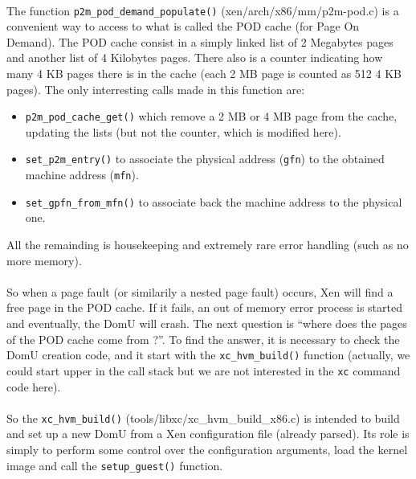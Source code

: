 \paragraph{}
The function \verb!p2m_pod_demand_populate()! (xen/arch/x86/mm/p2m-pod.c) is
a convenient way to access to what is called the POD cache (for Page On
Demand).
The POD cache consist in a simply linked list of 2 Megabytes pages and another
list of 4 Kilobytes pages.
There also is a counter indicating how many 4 KB pages there is in the cache
(each 2 MB page is counted as 512 4 KB pages).
The only interresting calls made in this function are:
\begin{itemize}
\item \verb!p2m_pod_cache_get()! which remove a 2 MB or 4 MB page from the
  cache, updating the lists (but not the counter, which is modified here).
\item \verb!set_p2m_entry()! to associate the physical address (\verb!gfn!)
  to the obtained machine address (\verb!mfn!).
\item \verb!set_gpfn_from_mfn()! to associate back the machine address to
  the physical one.
\end{itemize}
All the remainding is housekeeping and extremely rare error handling (such as
no more memory).

\paragraph{}
So when a page fault (or similarily a nested page fault) occurs, Xen will find
a free page in the POD cache.
If it fails, an out of memory error process is started and eventually, the
DomU will crash.
The next question is ``where does the pages of the POD cache come from ?''.
To find the answer, it is necessary to check the DomU creation code, and it
start with the \verb!xc_hvm_build()! function (actually, we could start upper
in the call stack but we are not interested in the \verb!xc! command code
here).

\paragraph{}
So the \verb!xc_hvm_build()! (tools/libxc/xc\_hvm\_build\_x86.c) is intended to
build and set up a new DomU from a Xen configuration file (already parsed).
Its role is simply to perform some control over the configuration arguments,
load the kernel image and call the \verb!setup_guest()! function.

